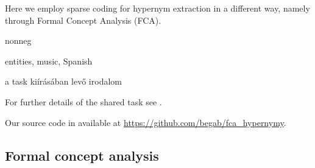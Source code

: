\documentclass[11pt,a4paper]{article}
\begin{document}
Here we employ sparse coding for hypernym extraction in a different way, namely
through Formal Concept Analysis (FCA).  

nonneg \citep{Faruqui:2015,Fyshe:2015}

entities, music, Spanish

a task kiírásában levő irodalom

For further details of the shared task see \cite{Camacho-Collados:2018}.

Our source code in available at \url{https://github.com/begab/fca_hypernymy}.

\subsection{Formal concept analysis}

\newcommand{\ob}{\ensuremath{\mathcal O}}
\newcommand{\at}{\ensuremath{\mathcal A}}
\newcommand{\inci}{\ensuremath{\mathcal I}}
\newcommand{\oaconc}{\ensuremath{\langle O, A\rangle}}
\end{document}
